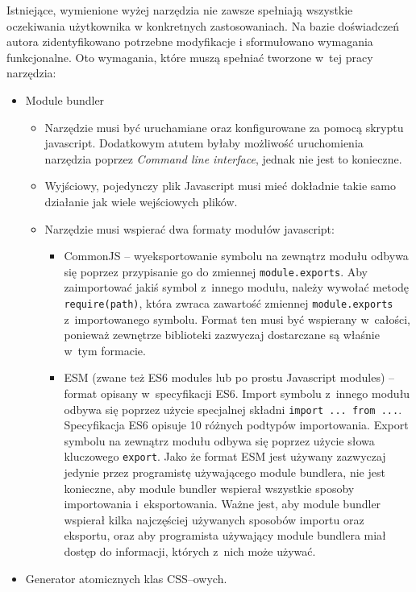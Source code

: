 \documentclass{SGGW-thesis}
\begin{document}
Istniejące, wymienione wyżej narzędzia nie zawsze spełniają wszystkie oczekiwania użytkownika w konkretnych zastosowaniach. Na bazie doświadczeń autora zidentyfikowano potrzebne modyfikacje i sformułowano wymagania funkcjonalne. Oto wymagania, które muszą spełniać tworzone w~tej pracy narzędzia:
\begin{itemize}
    \item Module bundler
    \begin{itemize}
        \item Narzędzie musi być uruchamiane oraz konfigurowane za pomocą skryptu javascript. Dodatkowym atutem byłaby możliwość uruchomienia narzędzia poprzez \emph{Command line interface}, jednak nie jest to konieczne.
        \item Wyjściowy, pojedynczy plik Javascript musi mieć dokładnie takie samo działanie jak wiele wejściowych plików.
        \item Narzędzie musi wspierać dwa formaty modułów javascript:
        \begin{itemize}
            \item CommonJS -- wyeksportowanie symbolu na zewnątrz modułu odbywa się poprzez przypisanie go do zmiennej \verb|module.exports|. Aby zaimportować jakiś symbol z~innego modułu, należy wywołać metodę \verb|require(path)|, która zwraca zawartość zmiennej \verb|module.exports| z~importowanego symbolu. Format ten musi być wspierany w~całości, ponieważ zewnętrze biblioteki zazwyczaj dostarczane są właśnie w~tym formacie.
            \item ESM (zwane też ES6 modules lub po prostu Javascript modules) -- format opisany w~specyfikacji ES6. Import symbolu z~innego modułu odbywa się poprzez użycie specjalnej składni \verb|import ... from ...|. Specyfikacja ES6 opisuje 10 różnych podtypów importowania\cite{es6_modules_import}. Export symbolu na zewnątrz modułu odbywa się poprzez użycie słowa kluczowego \verb|export|\cite{es6_modules_export}. Jako że format ESM jest używany zazwyczaj jedynie przez programistę używającego module bundlera, nie jest konieczne, aby module bundler wspierał wszystkie sposoby importowania i~eksportowania. Ważne jest, aby module bundler wspierał kilka najczęściej używanych sposobów importu oraz eksportu, oraz aby programista używający module bundlera miał dostęp do informacji, których z~nich może używać.
        \end{itemize}
    \end{itemize}
    \item Generator atomicznych klas CSS--owych.

\end{itemize}
\end{document}
